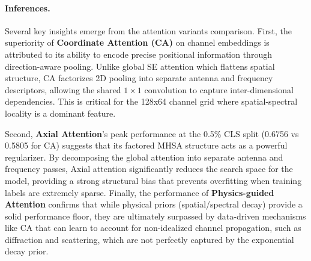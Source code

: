 \documentclass[12pt,a4paper]{article}
\begin{document}
\paragraph{Inferences.} Several key insights emerge from the attention variants comparison. First, the superiority of \textbf{Coordinate Attention (CA)} on channel embeddings is attributed to its ability to encode precise positional information through direction-aware pooling. Unlike global SE attention which flattens spatial structure, CA factorizes 2D pooling into separate antenna and frequency descriptors, allowing the shared $1 \times 1$ convolution to capture inter-dimensional dependencies. This is critical for the 128x64 channel grid where spatial-spectral locality is a dominant feature.

Second, \textbf{Axial Attention}'s peak performance at the 0.5\% CLS split (0.6756 vs 0.5805 for CA) suggests that its factored MHSA structure acts as a powerful regularizer. By decomposing the global attention into separate antenna and frequency passes, Axial attention significantly reduces the search space for the model, providing a strong structural bias that prevents overfitting when training labels are extremely sparse. Finally, the performance of \textbf{Physics-guided Attention} confirms that while physical priors (spatial/spectral decay) provide a solid performance floor, they are ultimately surpassed by data-driven mechanisms like CA that can learn to account for non-idealized channel propagation, such as diffraction and scattering, which are not perfectly captured by the exponential decay prior.

\begin{table}[H]
\centering
\caption{Test F1 scores on beam prediction with integrated attention mechanisms.}
\label{tab:results_p2}
\end{table}
\end{document}
